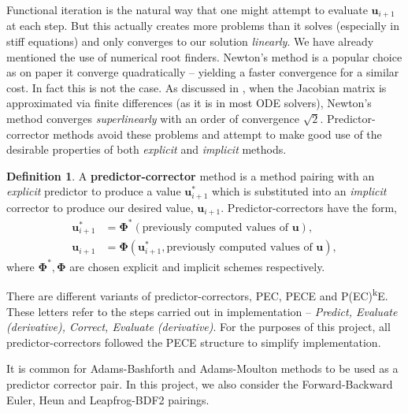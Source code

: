 \documentclass[12pt, twoside]{report}
\theoremstyle{plain}
\theoremstyle{definition}
\newtheorem{definition}{Definition}[chapter]
\theoremstyle{definition}
\begin{document}
        Functional iteration is the natural way that one might attempt to 
        evaluate $\mathbf{u}_{i+1}$ at each step. But this actually creates
        more problems than it solves (especially in stiff equations) and only 
        converges to our solution \textit{linearly}. We have already mentioned
        the use of numerical root finders. Newton's method is a popular choice 
        as on paper it converge quadratically -- yielding a faster convergence 
        for a similar cost. In fact this is not the case. As discussed in 
        \cite{press}, when the Jacobian matrix is approximated via finite 
        differences (as it is in most ODE solvers), Newton's method converges 
        \textit{superlinearly} with an order of convergence $\sqrt{2}$. 
        Predictor-corrector methods avoid these problems and attempt to make 
        good use of the desirable properties of both \textit{explicit} and 
        \textit{implicit} methods.

        \begin{definition}
        \label{2_pc_method}
            A \textbf{predictor-corrector} method is a method pairing with 
            an \textit{explicit} predictor to produce a value 
            $\mathbf{u}_{i+1}^*$ which is substituted into an 
            \textit{implicit} corrector to produce our desired value, 
            $\mathbf{u}_{i+1}$. Predictor-correctors have the form,
            \begin{align}
                \mathbf{u}_{i+1}^* &= \boldsymbol\Phi^* (\text{
                previously computed values of }\mathbf{u}),\\
                \mathbf{u}_{i+1} &= \boldsymbol\Phi(\mathbf u_{i+1}^*, 
                \text{previously computed values of }\mathbf u),
            \end{align}
            where $\boldsymbol\Phi^*, \boldsymbol\Phi $ are chosen explicit 
            and implicit schemes respectively.
        \end{definition}

        There are different variants of predictor-correctors, PEC, PECE and 
        P(EC)\textsuperscript{k}E. These letters refer to the steps carried out in implementation -- \textit{Predict, Evaluate (derivative), Correct, Evaluate (derivative)}. For the purposes of this project, all 
        predictor-correctors followed the PECE structure to simplify 
        implementation.

        It is common for Adams-Bashforth and Adams-Moulton methods to be used
        as a predictor corrector pair. In this project, we also consider the 
        Forward-Backward Euler, Heun and Leapfrog-BDF2 pairings.
\end{document}
